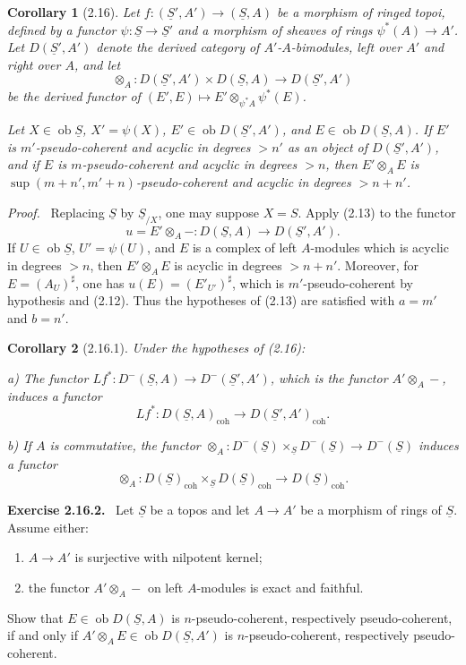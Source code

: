 \documentclass[13pt]{extarticle}
\newcommand{\uS}{\underline S}
\newcommand{\ob}{\operatorname{ob}}
\newenvironment{statement}[1]{\par\medskip\noindent\textbf{#1.}\ }{\par\medskip}
\newenvironment{prooftext}[1][Proof]{\par\noindent\emph{#1.}\ }{\par\medskip}
\newtheorem*{corollary*}{Corollary}
\begin{document}
\begin{corollary*}[2.16]
Let $f:(\uS',A')\to(\uS,A)$ be a morphism of ringed topoi, defined by a functor $\psi:\uS\to\uS'$ and a morphism of sheaves of rings $\psi^*(A)\to A'$. Let $D(\uS',A')$ denote the derived category of $A'$-$A$-bimodules, left over $A'$ and right over $A$, and let
\[
\otimes_A:D(\uS',A')\times D(\uS,A)\longrightarrow D(\uS',A')
\]
be the derived functor of $(E',E)\mapsto E'\otimes_{\psi^*A}\psi^*(E)$.

Let $X\in\ob\uS$, $X'=\psi(X)$, $E'\in\ob D(\uS',A')$, and $E\in\ob D(\uS,A)$. If $E'$ is $m'$-pseudo-coherent and acyclic in degrees $>n'$ as an object of $D(\uS',A')$, and if $E$ is $m$-pseudo-coherent and acyclic in degrees $>n$, then $E'\otimes_AE$ is $\sup(m+n',m'+n)$-pseudo-coherent and acyclic in degrees $>n+n'$.
\end{corollary*}

\begin{prooftext}
Replacing $\uS$ by $\uS_{/X}$, one may suppose $X=S$. Apply (2.13) to the functor
\[
u=E'\otimes_A -:D(\uS,A)\longrightarrow D(\uS',A').
\]
If $U\in\ob\uS$, $U'=\psi(U)$, and $E$ is a complex of left $A$-modules which is acyclic in degrees $>n$, then $E'\otimes_AE$ is acyclic in degrees $>n+n'$. Moreover, for $E=(A_U)^\sharp$, one has $u(E)=(E'_{U'})^\sharp$, which is $m'$-pseudo-coherent by hypothesis and (2.12). Thus the hypotheses of (2.13) are satisfied with $a=m'$ and $b=n'$.
\end{prooftext}

\begin{corollary*}[2.16.1]
Under the hypotheses of (2.16):

\textup{a)} The functor $Lf^*:D^-(\uS,A)\to D^-(\uS',A')$, which is the functor $A'\otimes_A-$, induces a functor
\[
Lf^*:D(\uS,A)_{\mathrm{coh}}\longrightarrow D(\uS',A')_{\mathrm{coh}}.
\]

\textup{b)} If $A$ is commutative, the functor $\otimes_A:D^-(\uS)\times_{\uS}D^-(\uS)\to D^-(\uS)$ induces a functor
\[
\otimes_A:D(\uS)_{\mathrm{coh}}\times_{\uS}D(\uS)_{\mathrm{coh}}\longrightarrow D(\uS)_{\mathrm{coh}}.
\]
\end{corollary*}

\begin{statement}{Exercise 2.16.2}
Let $\uS$ be a topos and let $A\to A'$ be a morphism of rings of $\uS$. Assume either:
\begin{enumerate}[label=(\roman*)]
\item $A\to A'$ is surjective with nilpotent kernel;
\item the functor $A'\otimes_A-$ on left $A$-modules is exact and faithful.
\end{enumerate}
Show that $E\in\ob D(\uS,A)$ is $n$-pseudo-coherent, respectively pseudo-coherent, if and only if $A'\otimes_AE\in\ob D(\uS,A')$ is $n$-pseudo-coherent, respectively pseudo-coherent.
\end{statement}
\end{document}
